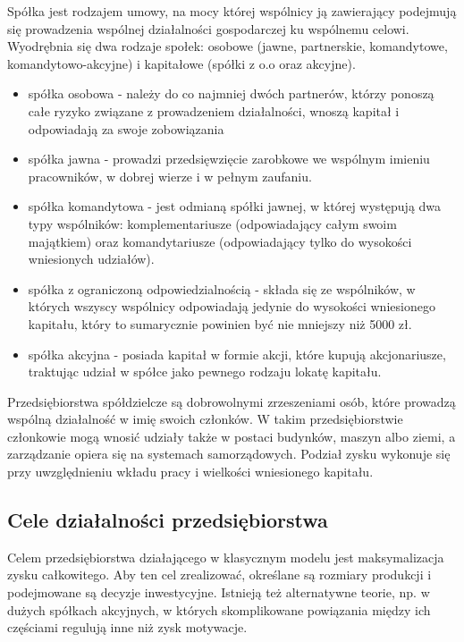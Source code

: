 \documentclass[12pt]{extarticle}
\begin{document}
Spółka jest rodzajem umowy, na mocy której wspólnicy ją zawierający podejmują się prowadzenia wspólnej działalności gospodarczej ku wspólnemu celowi. Wyodrębnia się dwa rodzaje społek: osobowe (jawne, partnerskie, komandytowe, komandytowo-akcyjne) i kapitałowe (spółki z o.o oraz akcyjne).

\begin{itemize}
	\item spółka osobowa - należy do co najmniej dwóch partnerów, którzy ponoszą całe ryzyko związane z prowadzeniem działalności, wnoszą kapitał i odpowiadają za swoje zobowiązania
    \item spółka jawna - prowadzi przedsięwzięcie zarobkowe we wspólnym imieniu pracowników, w dobrej wierze i w pełnym zaufaniu.
    \item spółka komandytowa - jest odmianą spółki jawnej, w której występują dwa typy wspólników: komplementariusze (odpowiadający całym swoim majątkiem) oraz komandytariusze (odpowiadający tylko do wysokości wniesionych udziałów).
    \item spółka z ograniczoną odpowiedzialnością - składa się ze wspólników, w których wszyscy wspólnicy odpowiadają jedynie do wysokości wniesionego kapitału, który to sumarycznie powinien być nie mniejszy niż 5000 zł.
    \item spółka akcyjna - posiada kapitał w formie akcji, które kupują akcjonariusze, traktując udział w spółce jako pewnego rodzaju lokatę kapitału.
\end{itemize}


Przedsiębiorstwa spółdzielcze są dobrowolnymi zrzeszeniami osób, które prowadzą wspólną działalność w imię swoich członków. W takim przedsiębiorstwie członkowie mogą wnosić udziały także w postaci budynków, maszyn albo ziemi, a zarządzanie opiera się na systemach samorządowych. Podział zysku wykonuje się przy uwzględnieniu wkładu pracy i wielkości wniesionego kapitału.

\subsection{Cele działalności przedsiębiorstwa}

Celem przedsiębiorstwa działającego w klasycznym modelu jest maksymalizacja zysku całkowitego. Aby ten cel zrealizować, określane są rozmiary produkcji i podejmowane są decyzje inwestycyjne. Istnieją też alternatywne teorie, np. w dużych spółkach akcyjnych, w których skomplikowane powiązania między ich częściami regulują inne niż zysk motywacje. 
\end{document}
